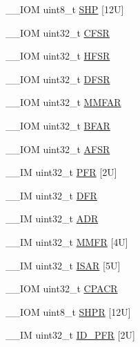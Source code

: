 \begin{DoxyCompactItemize}
\item 
\+\_\+\+\_\+\+I\+OM uint8\+\_\+t \mbox{\hyperlink{struct_s_c_b___type_a293826a2c44f754e80af03d62f62f9e6}{S\+HP}} \mbox{[}12\+U\mbox{]}
\item 
\+\_\+\+\_\+\+I\+OM uint32\+\_\+t \mbox{\hyperlink{struct_s_c_b___type_a0f9e27357254e6e953a94f95bda040b1}{C\+F\+SR}}
\item 
\+\_\+\+\_\+\+I\+OM uint32\+\_\+t \mbox{\hyperlink{struct_s_c_b___type_ab974e7ceb2e52a3fbcaa84e06e52922d}{H\+F\+SR}}
\item 
\+\_\+\+\_\+\+I\+OM uint32\+\_\+t \mbox{\hyperlink{struct_s_c_b___type_a3b590075aa07880ce686d5cfb4e61c5c}{D\+F\+SR}}
\item 
\+\_\+\+\_\+\+I\+OM uint32\+\_\+t \mbox{\hyperlink{struct_s_c_b___type_ae9d94d186615d57d38c9253cb842d244}{M\+M\+F\+AR}}
\item 
\+\_\+\+\_\+\+I\+OM uint32\+\_\+t \mbox{\hyperlink{struct_s_c_b___type_a3fde073744418e2fe476333cb4d55d0d}{B\+F\+AR}}
\item 
\+\_\+\+\_\+\+I\+OM uint32\+\_\+t \mbox{\hyperlink{struct_s_c_b___type_a3ef0057e48fdef798f2ee12125a80d9f}{A\+F\+SR}}
\item 
\+\_\+\+\_\+\+IM uint32\+\_\+t \mbox{\hyperlink{struct_s_c_b___type_a1ecf64bb2faf3ee512e4b40a290e4d71}{P\+FR}} \mbox{[}2\+U\mbox{]}
\item 
\+\_\+\+\_\+\+IM uint32\+\_\+t \mbox{\hyperlink{struct_s_c_b___type_ae2b3d4530d1b0c05593b634dc46348bd}{D\+FR}}
\item 
\+\_\+\+\_\+\+IM uint32\+\_\+t \mbox{\hyperlink{struct_s_c_b___type_a72572af6d5dece4947453aeabd52575f}{A\+DR}}
\item 
\+\_\+\+\_\+\+IM uint32\+\_\+t \mbox{\hyperlink{struct_s_c_b___type_a2d4cde1c9462f3733ab65d97f308c6fb}{M\+M\+FR}} \mbox{[}4\+U\mbox{]}
\item 
\+\_\+\+\_\+\+IM uint32\+\_\+t \mbox{\hyperlink{struct_s_c_b___type_af3bf768338667219b55cc904fa5b87f9}{I\+S\+AR}} \mbox{[}5\+U\mbox{]}
\item 
\+\_\+\+\_\+\+I\+OM uint32\+\_\+t \mbox{\hyperlink{struct_s_c_b___type_ab8e9dd6ca5f31244ea352ed0c19155d8}{C\+P\+A\+CR}}
\item 
\+\_\+\+\_\+\+I\+OM uint8\+\_\+t \mbox{\hyperlink{struct_s_c_b___type_a49f5a554705aebf542765b3a38f4feb9}{S\+H\+PR}} \mbox{[}12\+U\mbox{]}
\item 
\+\_\+\+\_\+\+IM uint32\+\_\+t \mbox{\hyperlink{struct_s_c_b___type_a37569b15cd2c9a50691e8b5e15a1d129}{I\+D\+\_\+\+P\+FR}} \mbox{[}2\+U\mbox{]}
\item 

\end{DoxyCompactItemize}
